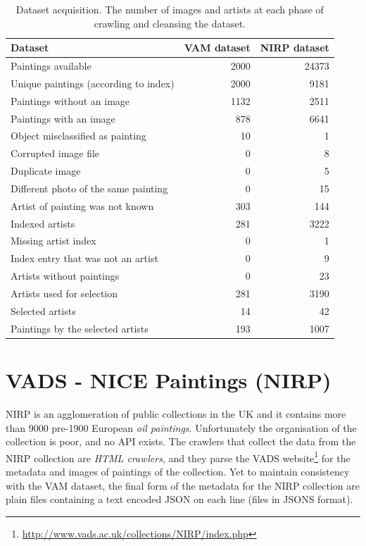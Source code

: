 \documentclass[11pt,a4paper,twoside,openright]{report}
\begin{document}
\begin{table}[ptb]
\centering
\begin{tabular}{|l|rr|}
\toprule
Dataset & VAM dataset & NIRP dataset \\
\midrule
Paintings available                   & 2000 & 24373 \\
Unique paintings (according to index) & 2000 &  9181 \\
Paintings without an image            & 1132 &  2511 \\
Paintings with an image               &  878 &  6641 \\
Object misclassified as painting      &   10 &     1 \\
Corrupted image file                  &    0 &     8 \\
Duplicate image                       &    0 &     5 \\
Different photo of the same painting  &    0 &    15 \\
Artist of painting was not known      &  303 &   144 \\
\midrule
Indexed artists                       &  281 &  3222 \\
Missing artist index                  &    0 &     1 \\
Index entry that was not an artist    &    0 &     9 \\
Artists without paintings             &    0 &    23 \\
Artists used for selection            &  281 &  3190 \\
Selected artists                      &   14 &    42 \\
\midrule
Paintings by the selected artists     &  193 &  1007 \\
\bottomrule
\end{tabular}
\caption[Dataset acquisition]{Dataset acquisition.  The number of images and
artists at each phase of crawling and cleansing the dataset.}
\label{tab:crawl}
\end{table}

\section{VADS - NICE Paintings (NIRP)}

NIRP is an agglomeration of public collections in the UK and it contains more
than 9000 pre-1900 European \emph{oil paintings}.  Unfortunately the
organisation of the collection is poor, and no API exists.  The crawlers that
collect the data from the NIRP collection are \emph{HTML crawlers}, and they
parse the VADS
website\footnote{\href{http://www.vads.ac.uk/collections/NIRP/index.php}
{http://www.vads.ac.uk/collections/NIRP/index.php}} for the metadata and images
of paintings of the collection.  Yet to maintain consistency with the VAM
dataset, the final form of the metadata for the NIRP collection are plain files
containing a text encoded JSON on each line (files in JSONS format).
\end{document}
